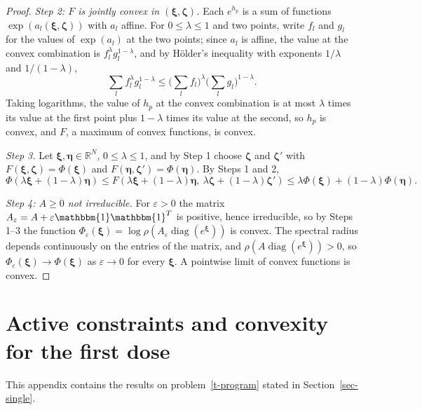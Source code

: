 \documentclass[11pt]{article}
\theoremstyle{plain}
\theoremstyle{definition}
\theoremstyle{remark}
\numberwithin{equation}{section}
\numberwithin{figure}{section}
\numberwithin{table}{section}
\numberwithin{algorithm}{section}
\begin{document}
\begin{proof}
\emph{Step 2: $F$ is jointly convex in $(\bm\xi,\bm\zeta)$.} Each $e^{h_p}$ is
a sum of functions $\exp\left(a_l(\bm\xi,\bm\zeta)\right)$ with $a_l$ affine.
For $0\le\lambda\le 1$ and two points, write $f_l$ and $g_l$ for the values of
$\exp(a_l)$ at the two points; since $a_l$ is affine, the value at the convex
combination is $f_l^{\lambda}g_l^{1-\lambda}$, and by H\"older's inequality
with exponents $1/\lambda$ and $1/(1-\lambda)$,
\begin{equation}
\sum_l f_l^{\lambda}g_l^{1-\lambda}\le\Big(\sum_l f_l\Big)^{\lambda}\Big(\sum_l g_l\Big)^{1-\lambda}.
\end{equation}
Taking logarithms, the value of $h_p$ at the convex combination is at most
$\lambda$ times its value at the first point plus $1-\lambda$ times its value
at the second, so $h_p$ is convex, and $F$, a maximum of convex functions, is
convex.

\emph{Step 3.} Let $\bm\xi,\bm\eta\in\mathbb{R}^N$, $0\le\lambda\le 1$, and by
Step 1 choose $\bm\zeta$ and $\bm\zeta'$ with $F(\bm\xi,\bm\zeta)=\Phi(\bm\xi)$
and $F(\bm\eta,\bm\zeta')=\Phi(\bm\eta)$. By Steps 1 and 2,
\begin{equation}
\Phi\left(\lambda\bm\xi+(1-\lambda)\bm\eta\right)
\le F\left(\lambda\bm\xi+(1-\lambda)\bm\eta,\ \lambda\bm\zeta+(1-\lambda)\bm\zeta'\right)
\le\lambda\Phi(\bm\xi)+(1-\lambda)\Phi(\bm\eta).
\end{equation}

\emph{Step 4: $A\ge 0$ not irreducible.} For $\varepsilon>0$ the matrix
$A_\varepsilon=A+\varepsilon\mathbbm{1}\mathbbm{1}^T$ is positive, hence
irreducible, so by Steps 1--3 the function
$\Phi_\varepsilon(\bm\xi)=\log\rho\left(A_\varepsilon\operatorname{diag}\left(e^{\bm\xi}\right)\right)$
is convex. The spectral radius depends continuously on the entries of the
matrix, and $\rho\left(A\operatorname{diag}\left(e^{\bm\xi}\right)\right)>0$, so
$\Phi_\varepsilon(\bm\xi)\to\Phi(\bm\xi)$ as $\varepsilon\to 0$ for every
$\bm\xi$. A pointwise limit of convex functions is convex.
\end{proof}

\section{Active constraints and convexity for the first dose}\label{sec-single-theory}

This appendix contains the results on problem~\eqref{t-program} stated in
Section~\ref{sec-single}.
\end{document}
